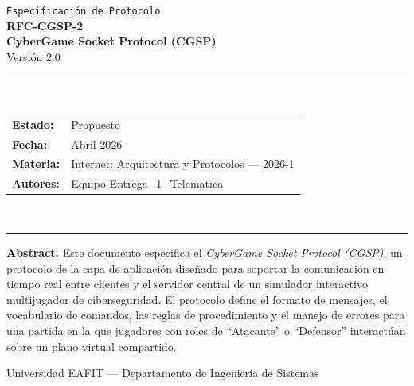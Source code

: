 \documentclass[12pt, letterpaper]{article}
\begin{document}
\begin{titlepage}
    \centering
    \vspace*{1cm}

    {\small\texttt{Especificación de Protocolo}}\\[0.3cm]
    {\Huge\bfseries\color{cgsp-blue} RFC-CGSP-2}\\[0.5cm]
    {\large\bfseries CyberGame Socket Protocol (CGSP)}\\[0.2cm]
    {\large Versión 2.0}

    \vspace{1.5cm}
    \rule{\textwidth}{1pt}\\[0.4cm]
    {\normalsize
        \begin{tabular}{ll}
            \textbf{Estado:}   & Propuesto \\[4pt]
            \textbf{Fecha:}    & Abril 2026 \\[4pt]
            \textbf{Materia:}  & Internet: Arquitectura y Protocolos --- 2026-1 \\[4pt]
            \textbf{Autores:}  & Equipo Entrega\_1\_Telematica
        \end{tabular}
    }\\[0.4cm]
    \rule{\textwidth}{1pt}

    \vspace{1.5cm}
    \begin{mdframed}[backgroundcolor=cgsp-gray, linecolor=cgsp-blue, linewidth=1pt]
        \textbf{Abstract.} Este documento especifica el \textit{CyberGame Socket Protocol
        (CGSP)}, un protocolo de la capa de aplicación diseñado para soportar la
        comunicación en tiempo real entre clientes y el servidor central de un simulador
        interactivo multijugador de ciberseguridad. El protocolo define el formato de
        mensajes, el vocabulario de comandos, las reglas de procedimiento y el manejo de
        errores para una partida en la que jugadores con roles de ``Atacante'' o
        ``Defensor'' interactúan sobre un plano virtual compartido.
    \end{mdframed}

    \vfill
    {\small Universidad EAFIT --- Departamento de Ingeniería de Sistemas}
\end{titlepage}

\tableofcontents
\newpage

\end{document}
